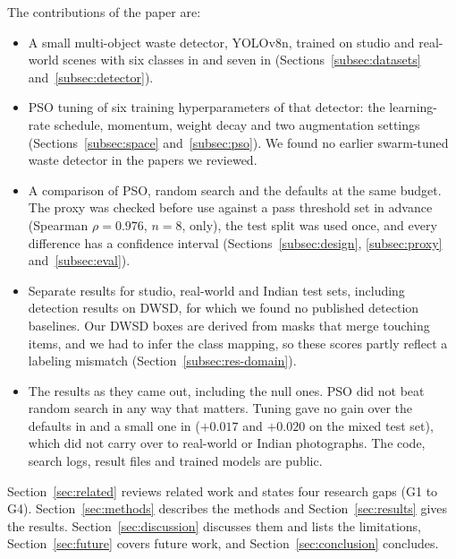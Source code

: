 The contributions of the paper are:
\begin{itemize}
\item A small multi-object waste detector, YOLOv8n, trained on studio and real-world scenes with six classes in \genone and seven in \gentwo (Sections~\ref{subsec:datasets} and~\ref{subsec:detector}).
\item PSO tuning of six training hyperparameters of that detector: the learning-rate schedule, momentum, weight decay and two augmentation settings (Sections~\ref{subsec:space} and~\ref{subsec:pso}). We found no earlier swarm-tuned waste detector in the papers we reviewed.
\item A comparison of PSO, random search and the defaults at the same budget. The proxy was checked before use against a pass threshold set in advance (Spearman $\rho = 0.976$, $n = 8$, \genone only), the test split was used once, and every difference has a confidence interval (Sections~\ref{subsec:design}, \ref{subsec:proxy} and~\ref{subsec:eval}).
\item Separate results for studio, real-world and Indian test sets, including detection results on DWSD, for which we found no published detection baselines. Our DWSD boxes are derived from masks that merge touching items, and we had to infer the class mapping, so these scores partly reflect a labeling mismatch (Section~\ref{subsec:res-domain}).
\item The results as they came out, including the null ones. PSO did not beat random search in any way that matters. Tuning gave no gain over the defaults in \genone and a small one in \gentwo ($+0.017$ and $+0.020$ \mapfifty on the mixed test set), which did not carry over to real-world or Indian photographs. The code, search logs, result files and trained models are public.
\end{itemize}

Section~\ref{sec:related} reviews related work and states four research gaps (G1 to G4). Section~\ref{sec:methods} describes the methods and Section~\ref{sec:results} gives the results. Section~\ref{sec:discussion} discusses them and lists the limitations, Section~\ref{sec:future} covers future work, and Section~\ref{sec:conclusion} concludes.

